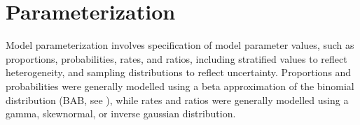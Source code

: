 \section{Parameterization}\label{model.par}
Model parameterization involves
specification of model parameter values, such as proportions, probabilities, rates, and ratios,
including stratified values to reflect heterogeneity,
and sampling distributions to reflect uncertainty.
Proportions and probabilities were generally modelled using
a beta approximation of the binomial distribution (BAB, see ),
while rates and ratios were generally modelled using
a gamma, skewnormal, or inverse gaussian distribution.





% 
% 
% 
% 
